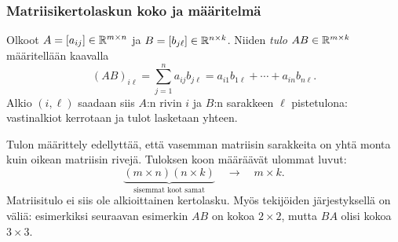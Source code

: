 \documentclass[11pt,a4paper]{amsart}
\begin{document}
  \subsubsection*{Matriisikertolaskun koko ja määritelmä}

  \begin{definition}[Matriisitulo]
    Olkoot $A=[a_{ij}]\in\mathbb{R}^{m\times n}$ ja
    $B=[b_{j\ell}]\in\mathbb{R}^{n\times k}$. Niiden \emph{tulo}
    $AB\in\mathbb{R}^{m\times k}$ määritellään kaavalla
    \[
      \boxed{(AB)_{i\ell}=\sum_{j=1}^n a_{ij}b_{j\ell}
      =a_{i1}b_{1\ell}+\cdots+a_{in}b_{n\ell}.}
    \]
    Alkio $(i,\ell)$ saadaan siis $A$:n rivin $i$ ja $B$:n sarakkeen
    $\ell$ pistetulona: vastinalkiot kerrotaan ja tulot lasketaan yhteen.
  \end{definition}

  Tulon määrittely edellyttää, että vasemman matriisin sarakkeita on
  yhtä monta kuin oikean matriisin rivejä. Tuloksen koon määräävät
  ulommat luvut:
  \[
    \underbrace{(m\times n)(n\times k)}_{\text{sisemmat koot samat}}
    \quad\longrightarrow\quad m\times k.
  \]
  Matriisitulo ei siis ole alkioittainen kertolasku. Myös tekijöiden
  järjestyksellä on väliä: esimerkiksi seuraavan esimerkin $AB$ on
  kokoa $2\times2$, mutta $BA$ olisi kokoa $3\times3$.
\end{document}
